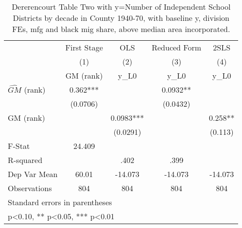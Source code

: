 \begin{table}[htbp]\centering
\def\sym#1{\ifmmode^{#1}\else\(^{#1}\)\fi}
\caption{Dererencourt Table Two with y=Number of Independent School Districts by decade in County 1940-70, with baseline y, division FEs, mfg and black mig share, above median area incorporated.}
\begin{tabular}{l*{4}{c}}
\toprule
                    & First Stage   &         OLS   &Reduced Form   &        2SLS   \\
                    &\multicolumn{1}{c}{(1)}&\multicolumn{1}{c}{(2)}&\multicolumn{1}{c}{(3)}&\multicolumn{1}{c}{(4)}\\
                    &\multicolumn{1}{c}{GM  (rank)}&\multicolumn{1}{c}{y\_L0}&\multicolumn{1}{c}{y\_L0}&\multicolumn{1}{c}{y\_L0}\\
\midrule
$\hat{GM}$ (rank)   &       0.362***&               &      0.0932** &               \\
                    &    (0.0706)   &               &    (0.0432)   &               \\
\addlinespace
GM  (rank)          &               &      0.0983***&               &       0.258** \\
                    &               &    (0.0291)   &               &     (0.113)   \\
\midrule
F-Stat              &      24.409   &               &               &               \\
R-squared           &               &        .402   &        .399   &               \\
Dep Var Mean        &       60.01   &     -14.073   &     -14.073   &     -14.073   \\
Observations        &         804   &         804   &         804   &         804   \\
\bottomrule
\multicolumn{5}{l}{\footnotesize Standard errors in parentheses}\\
\multicolumn{5}{l}{\footnotesize * p<0.10, ** p<0.05, *** p<0.01}\\
\end{tabular}
\end{table}

